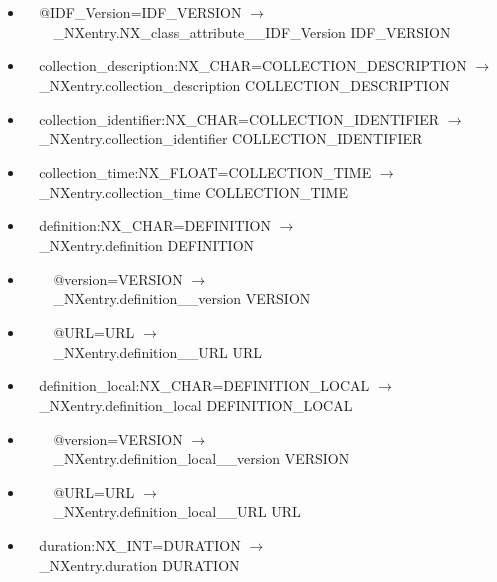 \documentclass[11pt]{article}
\begin{document}
{{\begin{itemize}
\item{\verb|  |@IDF\_Version=IDF\_VERSION $\rightarrow$\\
\verb|    |\_NXentry.NX\_class\_attribute\_\_IDF\_Version IDF\_VERSION}

\item{\verb|  |collection\_description:NX\_CHAR=COLLECTION\_DESCRIPTION $\rightarrow$\\
\verb|  |\_NXentry.collection\_description COLLECTION\_DESCRIPTION}

\item{\verb|  |collection\_identifier:NX\_CHAR=COLLECTION\_IDENTIFIER $\rightarrow$\\
\verb|  |\_NXentry.collection\_identifier COLLECTION\_IDENTIFIER}

\item{\verb|  |collection\_time:NX\_FLOAT=COLLECTION\_TIME $\rightarrow$\\
\verb|  |\_NXentry.collection\_time COLLECTION\_TIME}

\item{\verb|  |definition:NX\_CHAR=DEFINITION $\rightarrow$\\
\verb|  |\_NXentry.definition DEFINITION}

\item{\verb|    |@version=VERSION $\rightarrow$\\
\verb|    |\_NXentry.definition\_\_version VERSION}

\item{\verb|    |@URL=URL $\rightarrow$\\
\verb|    |\_NXentry.definition\_\_URL URL}

\item{\verb|  |definition\_local:NX\_CHAR=DEFINITION\_LOCAL $\rightarrow$\\
\verb|  |\_NXentry.definition\_local DEFINITION\_LOCAL}

\item{\verb|    |@version=VERSION $\rightarrow$\\
\verb|    |\_NXentry.definition\_local\_\_version VERSION}

\item{\verb|    |@URL=URL $\rightarrow$\\
\verb|    |\_NXentry.definition\_local\_\_URL URL}

\item{\verb|  |duration:NX\_INT=DURATION $\rightarrow$\\
\verb|  |\_NXentry.duration DURATION}


\end{itemize}}}
\end{document}
